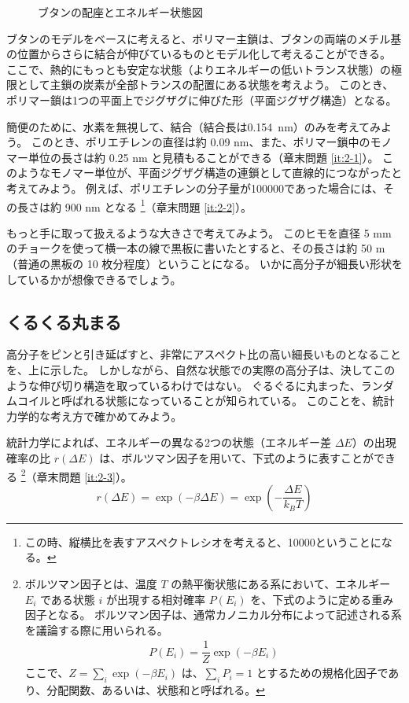 \documentclass[a4paper,11pt]{jlreq}
\begin{document}
\begin{figure}[htb]
 \centering
	
	\caption{ブタンの配座とエネルギー状態図}
	\label{fig:butane}
\end{figure}

ブタンのモデルをベースに考えると、ポリマー主鎖は、ブタンの両端のメチル基の位置からさらに結合が伸びているものとモデル化して考えることができる。
ここで、熱的にもっとも安定な状態（よりエネルギーの低いトランス状態）の極限として主鎖の炭素が全部トランスの配置にある状態を考えよう。
このとき、ポリマー鎖は1つの平面上でジグザグに伸びた形（平面ジグザグ構造）となる。

簡便のために、水素を無視して、結合（結合長は\qty{0.154}{nm}）のみを考えてみよう。
このとき、ポリエチレンの直径は約 0.09 nm、また、ポリマー鎖中のモノマー単位の長さは約 0.25 nm と見積もることができる（章末問題 \ref{it:2-1}）。
このようなモノマー単位が、平面ジグザグ構造の連鎖として直線的につながったと考えてみよう。
例えば、ポリエチレンの分子量が\num{100000}であった場合には、その長さは約 900 nm となる
\footnote
{
この時、縦横比を表すアスペクトレシオを考えると、10000ということになる。
}（章末問題 \ref{it:2-2}）。

もっと手に取って扱えるような大きさで考えてみよう。
このヒモを直径 5 mm のチョークを使って横一本の線で黒板に書いたとすると、その長さは約 50 m （普通の黒板の 10 枚分程度）ということになる。
いかに高分子が細長い形状をしているかが想像できるでしょう。
 


\subsection{くるくる丸まる}

高分子をピンと引き延ばすと、非常にアスペクト比の高い細長いものとなることを、上に示した。
しかしながら、自然な状態での実際の高分子は、決してこのような伸び切り構造を取っているわけではない。
ぐるぐるに丸まった、ランダムコイルと呼ばれる状態になっていることが知られている。
このことを、統計力学的な考え方で確かめてみよう。

統計力学によれば、エネルギーの異なる2つの状態（エネルギー差 $\Delta E$）の出現確率の比 $r(\Delta E)$ は、ボルツマン因子を用いて、下式のように表すことができる
\footnote
{
ボルツマン因子とは、温度 $T$ の熱平衡状態にある系において、エネルギー $E_i$ である状態 $i$ が出現する相対確率 $P(E_i)$ を、下式のように定める重み因子となる。
ボルツマン因子は、通常カノニカル分布によって記述される系を議論する際に用いられる。
\begin{align*}
P(E_i) = \dfrac{1}{Z} \exp(-\beta E_i)
\end{align*}
ここで、$Z=\sum_i \exp(-\beta E_i)$ は、$\sum_i P_i = 1$ とするための規格化因子であり、分配関数、あるいは、状態和と呼ばれる。

}（章末問題 \ref{it:2-3}）。
\begin{equation}
r(\Delta E) = \exp(-\beta \Delta E)=\exp \left( -\dfrac{\Delta E}{k_B T} \right)
\label{eq:ratio}
\end{equation}
\end{document}
